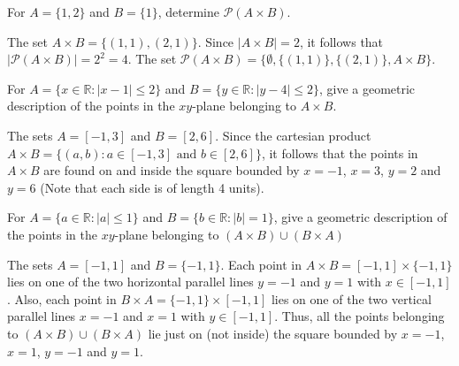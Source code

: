 \documentclass[12pt]{article}
\newcommand{\R}{\mathbb{R}}
\newenvironment{problem}[2][Problem]{\begin{trivlist}
		\item[\hskip \labelsep {\bfseries #1}\hskip \labelsep {\bfseries #2.}]}{\end{trivlist}}
\newenvironment{solution}[2][Solution]{\begin{trivlist}
		\item[\hskip \labelsep {\bfseries #1}\hskip \labelsep {\bfseries #2.}]}{\end{trivlist}}
\begin{document}
\begin{problem}{64}
	For $A = \{1,2\}$ and $B=\{1\}$, determine $\mathcal{P}(A\times B)$.
	\begin{solution}{}
		The set $A\times B = \{(1,1),(2,1)\}$. Since $|A\times B| = 2$, it follows that $|\mathcal{P}(A\times B)|= 2^{2}=4$. The set $\mathcal{P}(A\times B) = \{\emptyset,\{(1,1)\},\{(2,1)\},A\times B\}$.
	\end{solution}
\end{problem}

\begin{problem}{65}
	For $A=\{x\in \R:|x-1|\leq 2\}$ and $B=\{y\in \R: |y-4|\leq 2\}$, give a geometric description of the points in the $xy$-plane belonging to $A\times B$.
	\begin{solution}{}
		The sets $A=[-1,3]$ and $B=[2,6]$. Since the cartesian product $A\times B= \{(a,b):a\in [-1,3] \text{ and } b\in [2,6]\}$, it follows that the points in $A\times B$ are found on and inside the square bounded by $x=-1$, $x=3$, $y=2$ and $y=6$ (Note that each side is of length 4 units).
	\end{solution}
\end{problem} 
   
\begin{problem}{66}
	For $A=\{a \in \R:|a|\leq 1\}$ and $B=\{b\in \R: |b|=1\}$, give a geometric description of the points in the $xy$-plane belonging to $(A\times B)\cup(B\times A)$
	\begin{solution}{}
		The sets $A=[-1,1]$ and $B=\{-1,1\}$. Each point in $A\times B = [-1,1]\times \{-1,1\}$ lies on one of the two horizontal parallel lines $y=-1$ and $y=1$ with $x\in [-1,1]$. Also, each point in $B\times A = \{-1,1\}\times [-1,1]$  lies on one of the two vertical parallel lines $x=-1$ and $x=1$ with $y \in [-1,1]$. Thus, all the points belonging to $(A\times B)\cup(B\times A)$ lie just on (not inside) the square bounded by $x=-1$, $x=1$, $y=-1$ and $y=1$.
	\end{solution}
\end{problem}
\end{document}
